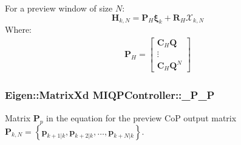\-For a preview window of size $N$\-: \[ \mathbf{H}_{k,N} = \mathbf{P}_H \mathbf{\xi}_k + \mathbf{R}_H \mathcal{X}_{k,N} \] \-Where\-: \begin{align*} \mathbf{P}_H = \left[\begin{array}{c} \mathbf{C}_H \mathbf{Q} \\ \vdots\\ \mathbf{C}_H \mathbf{Q}^N \end{array}\right] \end{align*} \hypertarget{classMIQPController_a8243f4111abb4ad6c331ac147a844118}{
\subsubsection[{\-\_\-\-P\-\_\-\-P}]{\setlength{\rightskip}{0pt plus 5cm}\-Eigen\-::\-Matrix\-Xd {\bf \-M\-I\-Q\-P\-Controller\-::\-\_\-\-P\-\_\-\-P}}}\label{classMIQPController_a8243f4111abb4ad6c331ac147a844118}
\-Matrix $\mathbf{P}_p$ in the equation for the preview \-Co\-P output matrix $\mathbf{P}_{k,N} = \left\{ \mathbf{p}_{k+1|k}, \mathbf{p}_{k+2|k}, \dots, \mathbf{p}_{k+N|k} \right\}$.

